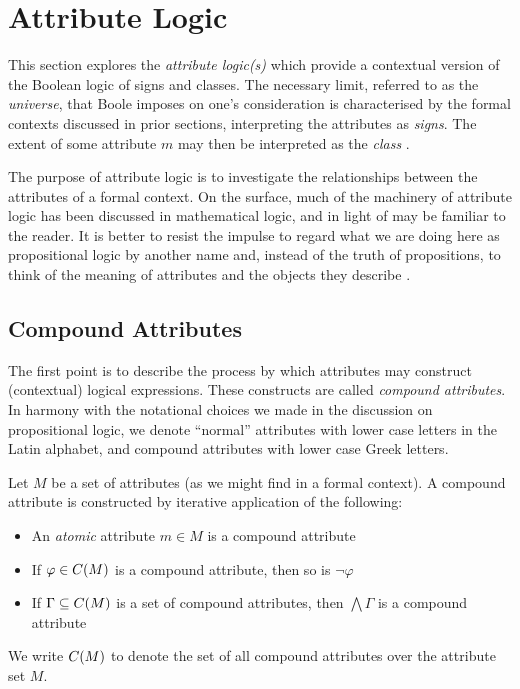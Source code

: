 \section{Attribute Logic}
\label{section:attribute-logic}

This section explores the \textit{attribute logic(s)} \cite{ganter1999contextual,ganter2025language} which provide a
contextual version of the Boolean logic of signs and classes. The necessary limit, referred to as the \textit{universe},
that Boole imposes on one's consideration is characterised by the formal contexts discussed in prior sections, interpreting
the attributes as \textit{signs}. The extent of some attribute $m$ may then be interpreted as the \textit{class}
\cite{Wille2000}.

The purpose of attribute logic is to investigate the relationships between the attributes of a formal context. On the surface,
much of the machinery of attribute logic has been discussed in mathematical logic, and in light of 
may be familiar to the reader. It is better to resist the impulse to regard what we are doing here as propositional
logic by another name and, instead of the truth of propositions, to think of the meaning of attributes and the objects
they describe \cite{ganter2025language}.

\subsection{Compound Attributes}
\label{subsection:compound-attributes}

The first point is to describe the process by which attributes may construct (contextual) logical expressions. These
constructs are called \textit{compound attributes}. In harmony with the notational choices we made in the discussion on
propositional logic, we denote ``normal'' attributes with lower case letters in the Latin alphabet, and compound
attributes with lower case Greek letters.

\begin{definition}
	\label{definition:compound-attributes} 

	Let $M$ be a set of attributes (as we might find in a formal context). A compound attribute is constructed by iterative
	application of the following: 
	\begin{itemize}[itemsep=-0em]
		\item An \textit{atomic} attribute $m\in M$ is a compound attribute

		\item If $\varphi \in C(M)$ is a compound attribute, then so is $\neg \varphi$

		\item If $\Gamma \subseteq C(M)$ is a set of compound attributes, then $\bigwedge \Gamma$ is a compound attribute
	\end{itemize}
	We write $C(M)$ to denote the set of all compound attributes over the attribute set $M$.
\end{definition}

